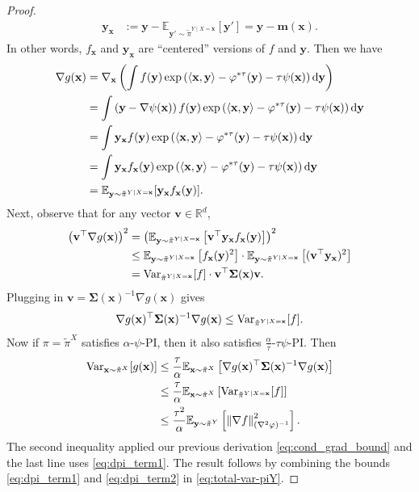 \documentclass[11pt]{article}
\newcommand{\defeq}{:=}
\newcommand{\norm}[1]{\left\lVert#1\right\rVert}
\newcommand{\inprod}[2]{\left\langle#1, #2\right\rangle}
\newcommand{\R}{\mathbb{R}}
\newcommand{\E}{\mathbb{E}}
\newcommand{\Var}{\textup{Var}}
\newcommand{\dd}{\textup{d}}
\newcommand{\Par}[1]{\left(#1\right)}
\newcommand{\Brack}[1]{\left[#1\right]}
\newcommand{\0}{\mathbf{0}}
\newcommand{\1}{\mathbf{1}}
\newcommand{\vm}{\mathbf{m}}
\newcommand{\vv}{\mathbf{v}}
\newcommand{\vx}{\mathbf{x}}
\newcommand{\vy}{\mathbf{y}}
\newcommand{\msig}{\boldsymbol{\Sigma}}
\newcommand{\vhi}{\varphi}
\newcommand{\tpi}{\tilde{\pi}}
\begin{document}
\begin{proof}
\begin{align*}
\vy_\vx &\defeq \vy - \E_{\vy'\sim\tilde{\pi}^{Y\mid X=\vx}}[\vy']= \vy - \vm(\vx).
\end{align*}
In other words, $f_\vx$ and $\vy_\vx$ are ``centered'' versions of $f$ and $\vy$. Then we have
\begin{align*}
\nabla g(\vx) &= \nabla_{\vx}\Par{ \int f(\vy)\exp\Par{\inprod{\vx}{\vy} - \vhi^{*\tau}(\vy) - \tau \psi(\vx)} \dd \vy} \\
&= \int \Par{\vy - \nabla \psi(\vx)} f(\vy)\exp\Par{\inprod{\vx}{\vy} - \vhi^{*\tau}(\vy) - \tau\psi(\vx)} \dd \vy \\
&= \int \vy_{\vx} f(\vy)\exp\Par{\inprod{\vx}{\vy} - \vhi^{*\tau}(\vy) - \tau\psi(\vx)} \dd \vy \\
&= \int \vy_{\vx} f_{\vx}(\vy)\exp\Par{\inprod{\vx}{\vy} - \vhi^{*\tau}(\vy) - \tau\psi(\vx)} \dd \vy \\
&= \E_{\vy \sim \tilde{\pi}^{Y\mid X=\vx}}[\vy_\vx f_\vx(\vy)].
\end{align*}
Next, observe that for any vector $\vv \in \R^d$, 
\begin{align*}
\Par{\vv^\top \nabla g(\vx)}^2 &= \Par{\E_{\vy \sim \tilde{\pi}^{Y\mid X=\vx}}\Brack{\vv^\top\vy_\vx f_\vx(\vy)}}^2 \\
&\le \E_{\vy \sim \tilde{\pi}^{Y\mid X=\vx}}\Brack{f_\vx(\vy)^2} \cdot \E_{\vy \sim \tilde{\pi}^{Y\mid X=\vx}}\Brack{(\vv^\top \vy_\vx)^2} \\
&= \Var_{\tilde{\pi}^{Y\mid X=\vx}}[f] \cdot \vv^\top \msig(\vx) \vv.
\end{align*}
Plugging in $\vv = \msig(\vx)^{-1} \nabla g(\vx)$ gives
\begin{equation}\label{eq:cond_grad_bound}
\nabla g(\vx)^\top \msig(\vx)^{-1} \nabla g(\vx) \le \Var_{\tilde{\pi}^{Y\mid X=\vx}}[f].
\end{equation}
Now if $\pi=\tpi^X$ satisfies $\alpha$-$\psi$-PI, then it also satisfies $\frac \alpha \tau$-$\tau\psi$-PI.  Then
\begin{equation}\label{eq:dpi_term2}
\begin{aligned}
\Var_{\vx \sim \tpi^X}[g(\vx)] &\le \frac{\tau}{\alpha} \E_{\vx \sim \tpi^X}\Brack{\nabla g(\vx)^\top \msig(\vx)^{-1} \nabla g(\vx)} \\
&\le \frac{\tau}{\alpha} \E_{\vx \sim \tpi^X}\Brack{\Var_{\tpi^{Y\mid X=\vx}}[f]} \\
&\le \frac{\tau^2}{\alpha} \E_{\vy \sim \tpi^Y}\Brack{\norm{\nabla f}^2_{(\nabla^2 \vhi)^{-1}}}.
\end{aligned}
\end{equation}
The second inequality applied our previous derivation \eqref{eq:cond_grad_bound} and the last line uses \eqref{eq:dpi_term1}. The result follows by combining the bounds \eqref{eq:dpi_term1} and \eqref{eq:dpi_term2} in \eqref{eq:total-var-piY}.
\end{proof}
\end{document}
